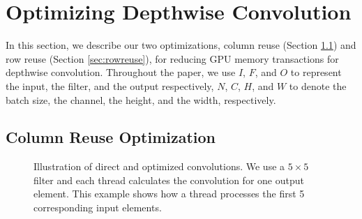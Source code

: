 \section{Optimizing Depthwise Convolution}
\label{sec:strategies} In this section, we describe our two optimizations, column reuse (Section \ref{sec:creuse}) and row reuse (Section \ref{sec:rowreuse}), for reducing GPU memory transactions for depthwise convolution.
Throughout the paper, we use $I$, $F$, and $O$ to represent the input, the filter, and the output respectively, $N$, $C$, $H$, and $W$ to denote the batch size, the channel, the height, and the width, respectively.

\subsection{Column Reuse Optimization}
\label{sec:creuse}

\begin{figure}[!t]
\centering
{}
\hspace{0em}
\hspace{0em}

\caption{Illustration of direct and optimized convolutions. We use a $5 \times 5$ filter  and each thread calculates the convolution for one
output element. This example shows how a thread processes the first 5 corresponding input elements.} \label{fig:corealgo}
\end{figure}

